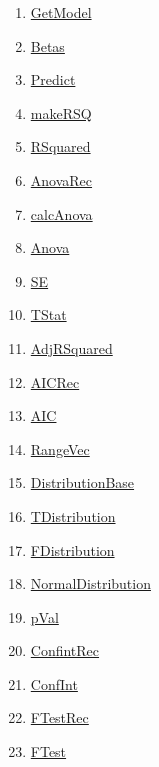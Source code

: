 \begin{enumerate}
\item \hyperlink{ecldoc:linearregression.ols.getmodel}{GetModel}
\item \hyperlink{ecldoc:linearregression.ols.betas}{Betas}
\item \hyperlink{ecldoc:linearregression.ols.predict}{Predict}
\item \hyperlink{ecldoc:linearregression.ols.makersq}{makeRSQ}
\item \hyperlink{ecldoc:linearregression.ols.rsquared}{RSquared}
\item \hyperlink{ecldoc:linearregression.ols.anovarec}{AnovaRec}
\item \hyperlink{ecldoc:linearregression.ols.calcanova}{calcAnova}
\item \hyperlink{ecldoc:linearregression.ols.anova}{Anova}
\item \hyperlink{ecldoc:linearregression.ols.se}{SE}
\item \hyperlink{ecldoc:linearregression.ols.tstat}{TStat}
\item \hyperlink{ecldoc:linearregression.ols.adjrsquared}{AdjRSquared}
\item \hyperlink{ecldoc:linearregression.ols.aicrec}{AICRec}
\item \hyperlink{ecldoc:linearregression.ols.aic}{AIC}
\item \hyperlink{ecldoc:linearregression.ols.rangevec}{RangeVec}
\item \hyperlink{ecldoc:linearregression.ols.distributionbase}{DistributionBase}
\item \hyperlink{ecldoc:linearregression.ols.tdistribution}{TDistribution}
\item \hyperlink{ecldoc:linearregression.ols.fdistribution}{FDistribution}
\item \hyperlink{ecldoc:linearregression.ols.normaldistribution}{NormalDistribution}
\item \hyperlink{ecldoc:linearregression.ols.pval}{pVal}
\item \hyperlink{ecldoc:linearregression.ols.confintrec}{ConfintRec}
\item \hyperlink{ecldoc:linearregression.ols.confint}{ConfInt}
\item \hyperlink{ecldoc:linearregression.ols.ftestrec}{FTestRec}
\item \hyperlink{ecldoc:linearregression.ols.ftest}{FTest}
\end{enumerate}
